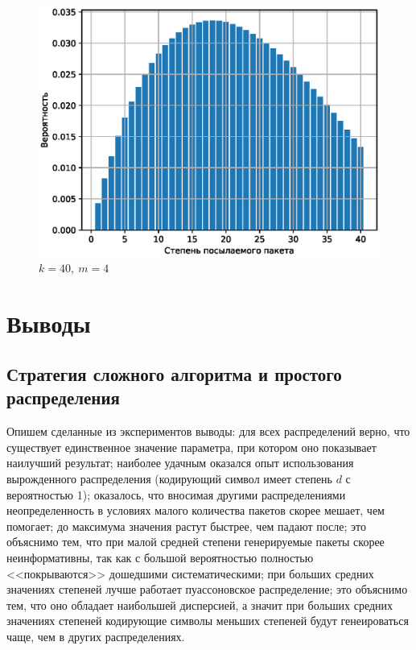 \begin{figure}[ht]
    \centering
    \includegraphics[scale=0.5]{img/distr2.eps}
    \caption{$k=40, \: m=4$}
    \label{fig:dist2}
\end{figure}

\section{Выводы}

\subsection{Стратегия сложного алгоритма и простого распределения}

Опишем сделанные из экспериментов выводы: для всех распределений верно, что существует единственное значение параметра, при котором оно показывает
наилучший результат;
    наиболее удачным оказался опыт использования вырожденного распределения (кодирующий символ имеет степень $d$ с вероятностью 1);
        оказалось, что вносимая другими распределениями неопределенность в условиях малого количества пакетов скорее мешает, чем помогает;
    до максимума значения растут быстрее, чем падают после; это объяснимо тем, что при малой средней степени генерируемые пакеты
        скорее неинформативны, так как с большой вероятностью полностью <<покрываются>> дошедшими систематическими;
    при больших средних значениях степеней лучше работает пуассоновское распределение; это объяснимо тем, что оно обладает наибольшей дисперсией, а значит при больших средних значениях степеней кодирующие символы меньших степеней будут генеироваться чаще, чем в других
        распределениях.

